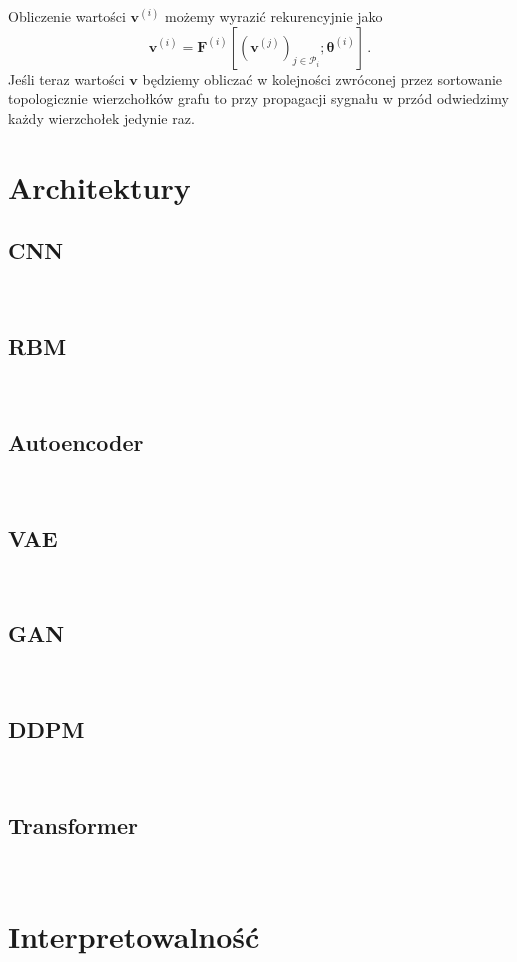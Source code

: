 \documentclass{myclass}
\begin{document}
Obliczenie wartości \(\bm{v}^{(i)}\) możemy wyrazić rekurencyjnie jako
\[
    \bm{v}^{(i)} = \bm{F}^{(i)}\left[ \left(\bm{v}^{(j)}\right)_{j \in \mathscr{P}_i}; \bm{\theta}^{(i)}\right] \,.
\]
Jeśli teraz wartości \(\bm{v}\) będziemy obliczać w kolejności zwróconej przez sortowanie
topologicznie wierzchołków grafu to przy propagacji sygnału w przód odwiedzimy każdy wierzchołek
jedynie raz.



\section{Architektury}

\subsection{CNN}
~

\subsection{RBM}
~

\subsection{Autoencoder}
~

\subsection{VAE}
~

\subsection{GAN}
~

\subsection{DDPM}
~

\subsection{Transformer}
~

\section{Interpretowalność}
~
\end{document}

